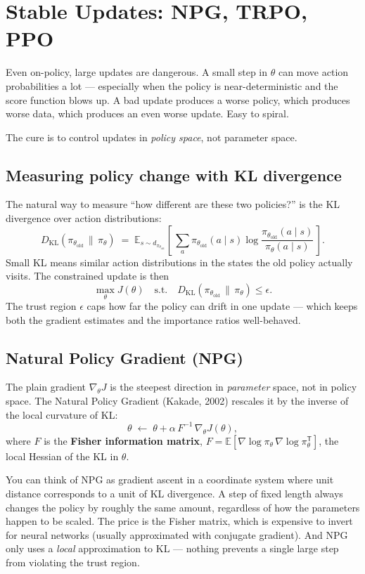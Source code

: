 \documentclass[11pt, oneside]{book}
\newcommand{\E}{\mathbb{E}}              %
\newcommand{\KL}[2]{D_{\mathrm{KL}}\!\left(#1 \,\|\, #2\right)}
\newcommand{\T}{^{\mathsf{T}}}           %
\begin{document}
\section{Stable Updates: NPG, TRPO, PPO}

Even on-policy, large updates are dangerous.
A small step in $\theta$ can move action probabilities a lot --- especially when the
policy is near-deterministic and the score function blows up.
A bad update produces a worse policy, which produces worse data, which produces an
even worse update. Easy to spiral.

The cure is to control updates in \emph{policy space}, not parameter space.

\subsection{Measuring policy change with KL divergence}

The natural way to measure ``how different are these two policies?'' is the
KL divergence over action distributions:
\[
  \KL{\pi_{\theta_{\text{old}}}}{\pi_\theta}
  \;=\; \E_{s \sim d_{\pi_{\theta_{\text{old}}}}}\!\left[\, \sum_a \pi_{\theta_{\text{old}}}(a \mid s) \log \frac{\pi_{\theta_{\text{old}}}(a \mid s)}{\pi_\theta(a \mid s)}\, \right].
\]
Small KL means similar action distributions in the states the old policy actually visits.
The constrained update is then
\[
  \max_\theta J(\theta) \quad \text{s.t.} \quad \KL{\pi_{\theta_{\text{old}}}}{\pi_\theta} \le \epsilon.
\]
The trust region $\epsilon$ caps how far the policy can drift in one update --- which
keeps both the gradient estimates and the importance ratios well-behaved.

\subsection{Natural Policy Gradient (NPG)}

The plain gradient $\nabla_\theta J$ is the steepest direction in \emph{parameter}
space, not in policy space.
The Natural Policy Gradient (Kakade, 2002) rescales it by the inverse of the local
curvature of KL:
\[
  \theta \;\leftarrow\; \theta + \alpha\, F^{-1}\, \nabla_\theta J(\theta),
\]
where $F$ is the \textbf{Fisher information matrix},
$F = \E[\nabla \log \pi_\theta\, \nabla \log \pi_\theta\T]$, the local Hessian of the
KL in $\theta$.

\begin{intbox}
You can think of NPG as gradient ascent in a coordinate system where unit distance
corresponds to a unit of KL divergence.
A step of fixed length always changes the policy by roughly the same amount, regardless
of how the parameters happen to be scaled.
The price is the Fisher matrix, which is expensive to invert for neural networks
(usually approximated with conjugate gradient).
And NPG only uses a \emph{local} approximation to KL --- nothing prevents a single
large step from violating the trust region.
\end{intbox}
\end{document}
